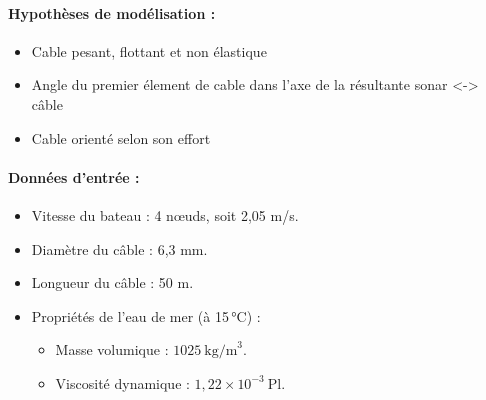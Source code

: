 \documentclass[12pt,a4paper]{report}
\begin{document}
\paragraph{Hypothèses de modélisation :}
\begin{itemize}
    \item Cable pesant, flottant et non élastique
    \item Angle du premier élement de cable dans l'axe de la résultante sonar <-> câble
    \item Cable orienté selon son effort
\end{itemize}

\paragraph{Données d’entrée :}
\begin{itemize}
  \item Vitesse du bateau : 4 nœuds, soit 2{,}05 m/s.
  \item Diamètre du câble : 6{,}3 mm.
  \item Longueur du câble : 50 m.
  \item Propriétés de l’eau de mer (à 15\,°C) :
  \begin{itemize}
    \item Masse volumique : \( 1025~\text{kg/m}^3 \).
    \item Viscosité dynamique : \( 1{,}22 \times 10^{-3}~\text{Pl} \).
  \end{itemize}
\end{itemize}
\end{document}
